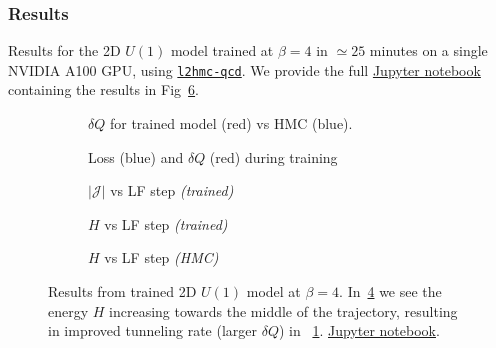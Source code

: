 \documentclass[a4paper,11pt]{article}
\begin{document}
\subsubsection{\label{subsubsec:2dResults}Results}
%
Results for the 2D $U(1)$ model trained at $\beta = 4$ in $\simeq 25$ minutes on a single NVIDIA A100 GPU, using \href{https://github.com/saforem2/l2hmc-qcd}{\faGithubAlt \texttt{l2hmc-qcd}}.
%
We provide the full \href{https://saforem2.github.io/l2hmc-qcd/qmd/l2hmc-2dU1/l2hmc-2dU1.html}{ Jupyter notebook} containing the results in Fig~\ref{fig:2dU1}.
%
%
%
\begin{figure}[htpb!]
    \centering
    \hfill
    \begin{subfigure}{0.4\textwidth}
        
        \caption{\label{subfig:dqhist}$\delta Q$ for trained model (red) vs HMC (blue).}
    \end{subfigure}
    \hfill
    \begin{subfigure}{0.55\textwidth}
        
        \caption{\label{subfig:loss_dQint}Loss (blue) and $\delta Q$ (red) during training}
    \end{subfigure}
    \hfill
    \begin{subfigure}{0.30\textwidth}
        
        \caption{\label{subfig:logdet2dU1}$|\mathcal{J}|$ vs LF step \emph{(trained)}}
    \end{subfigure}
    \hfill
    \begin{subfigure}{0.30\textwidth}
        
        \caption{\label{subfig:energy2dU1}$H$ vs LF step \emph{(trained)}}
    \end{subfigure}
    \hfill
    \begin{subfigure}{0.30\textwidth}
        
        \caption{\label{subfig:energy2dU1hmc}$H$ vs LF step \emph{(HMC)}}
    \end{subfigure}
    \hfill
    \caption{\label{fig:2dU1}Results from trained 2D $U(1)$ model at $\beta = 4$. In~\ref{subfig:energy2dU1} we see the energy $H$ increasing towards the middle of the trajectory, resulting in improved tunneling rate (larger $\delta Q$) in ~\ref{subfig:dqhist}. \href{https://saforem2.github.io/l2hmc-qcd/qmd/l2hmc-2dU1/l2hmc-2dU1.html}{ Jupyter notebook}.}
\end{figure}
%
\end{document}

